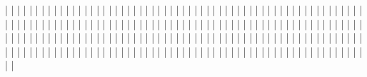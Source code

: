 |                   |
|                   |
|                   |
|                   |
|                   |
|                   |
|                   |
|                   |
|                   |
|                   |
|                   |
|                   |
|                   |
|                   |
|                   |
|                   |
|                   |
|                   |
|                   |
|                   |
|                   |
|                   |
|                   |
|                   |
|                   |
|                   |
|                   |
|                   |
|                   |
|                   |
|                   |
|                   |
|                   |
|                   |
|                   |
|                   |
|                   |
|                   |
|                   |
|                   |
|                   |
|                   |
|                   |
|                   |
|                   |
|                   |
|                   |
|                   |
|                   |
|                   |
|                   |
|                   |
|                   |
|                   |
|                   |
|                   |
|                   |
|                   |
|                   |
|                   |
|                   |
|                   |
|                   |
|                   |
|                   |
|                   |
|                   |
|                   |
|                   |
|                   |
|                   |
|                   |
|                   |
|                   |
|                   |
|                   |
|                   |
|                   |
|                   |
|                   |
|                   |
|                   |
|                   |
|                   |
|                   |
|                   |
|                   |
|                   |
|                   |
|                   |
|                   |
|                   |
|                   |
|                   |
|                   |
|                   |
|                   |
|                   |
|                   |
|                   |
|                   |
|                   |
|                   |
|                   |
|                   |
|                   |
|                   |
|                   |
|                   |
|                   |
|                   |
|                   |
|                   |
|                   |
|                   |
|                   |
|                   |
|                   |
|                   |
